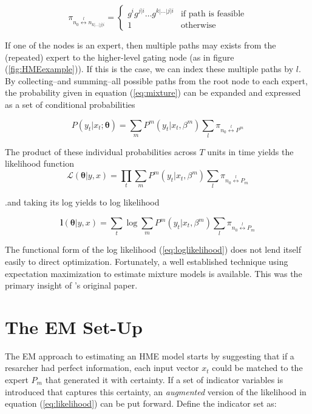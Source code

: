 \documentclass[12pt]{article}
\begin{document}
\begin{equation} \label{eq:gpath}
  \pi_{n_{0} \overset{l}{\longleftrightarrow} n_{k|\ldots|j|i}} =
    \begin{cases} 
       g^{i}g^{j|i} \ldots g^{k|\dots|j|i} & \textrm{if path is feasible} \\
       1 & \textrm{otherwise}
    \end{cases}
\end{equation}

If one of the nodes is an expert, then multiple paths may exists from the (repeated) expert to the higher-level gating node (as in figure (\ref{fig:HMEexample})). If this is the case, we can index these multiple paths by $l$. By collecting--and summing--all possible paths from the root node to each expert, the probability given in equation (\ref{eq:mixture}) can be expanded and expressed as a set of conditional probabilities

\begin{equation} \label{eq:contribution}
  P(y_{t}|x_{t};\boldsymbol{\theta}) = \sum_{m}P^{m}(y_{t}|x_{t},\beta^{m})\sum_{l}\pi_{n_{0} \overset{l}{\longleftrightarrow} P^{m}}
\end{equation}

The product of these individual probabilities across $T$ units in time yields the likelihood function
\begin{equation} \label{eq:likelihood}
  \mathcal{L}(\boldsymbol{\theta}|y,x) = \prod_{t}\sum_{m}P^{m}(y_{t}|x_{t},\beta^{m})\sum_{l}\pi_{n_{0} \overset{l}{\longleftrightarrow} P_{m}}
\end{equation}

.and taking its log yields to log likelihood

\begin{equation} \label{eq:loglikelihood}
  \boldsymbol{l}(\boldsymbol{\theta}|y,x) = \sum_{t}\log\sum_{m}P^{m}(y_{t}|x_{t},\beta^{m})\sum_{l}\pi_{n_{0}\overset{l}{\longleftrightarrow} P_{m}}
\end{equation}

The functional form of the log likelihood (\ref{eq:loglikelihood}) does not
lend itself easily to direct optimization. Fortunately, a well established
technique using expectation maximization \cite{EM_DLR1977} to estimate mixture
models is available. This was the primary insight of \cite{JordanJacobs1993}'s
original paper.

\section{The EM Set-Up}
The EM approach to estimating an HME model starts by suggesting that if a
resarcher had perfect information, each input vector $x_{t}$ could be matched
to the expert $P_{m}$ that generated it with certainty. If a set of indicator
variables is introduced that captures this certainty, an \textit{augmented}
version of the likelihood in equation (\ref{eq:likelihood}) can be put forward.
Define the indicator set as:
\end{document}
